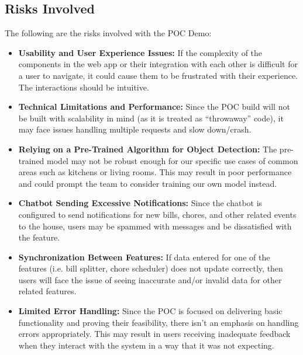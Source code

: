 \documentclass{article}
\begin{document}
\subsection{Risks Involved}
The following are the risks involved with the POC Demo:
\begin{itemize}
\item \textbf{Usability and User Experience Issues:} If the complexity of the components in the web app or their integration with each other is difficult for a user to navigate, it could cause them to be frustrated with their experience. The interactions should be intuitive. 
\item \textbf{Technical Limitations and Performance:} Since the POC build will not be built with scalability in mind (as it is treated as “throwaway” code), it may face issues handling multiple requests and slow down/crash.
\item \textbf{Relying on a Pre-Trained Algorithm for Object Detection:} The pre-trained model may not be robust enough for our specific use cases of common areas such as kitchens or living rooms. This may result in poor performance and could prompt the team to consider training our own model instead.
\item \textbf{Chatbot Sending Excessive Notifications:} Since the chatbot is configured to send notifications for new bills, chores, and other related events to the house, users may be spammed with messages and be dissatisfied with the feature.
\item \textbf{Synchronization Between Features:} If data entered for one of the features (i.e. bill splitter, chore scheduler) does not update correctly, then users will face the issue of seeing inaccurate and/or invalid data for other related features.
\item \textbf{Limited Error Handling:} Since the POC is focused on delivering basic functionality and proving their feasibility, there isn’t an emphasis on handling errors appropriately. This may result in users receiving inadequate feedback when they interact with the system in a way that it was not expecting.
\end{itemize}
\end{document}
